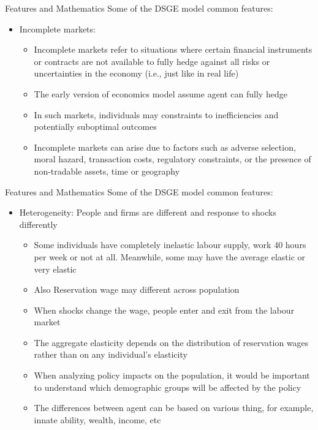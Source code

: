 \documentclass[aspectratio=1610]{beamer}
\begin{document}
\begin{frame}[wide]{Features and Mathematics}
	Some of the DSGE model common features:
	\begin{itemize}
		\item Incomplete markets:
		\begin{itemize}
			\item Incomplete markets refer to situations where certain financial instruments or contracts are not available to fully hedge against all risks or uncertainties in the economy (i.e., just like in real life)
			\item The early version of economics model assume agent can fully hedge 
			\item In such markets, individuals may constraints to inefficiencies and potentially suboptimal outcomes
			\item Incomplete markets can arise due to factors such as adverse selection, moral hazard, transaction costs, regulatory constraints, or the presence of non-tradable assets, time or geography
		\end{itemize}
	\end{itemize}
\end{frame}

\begin{frame}[wide]{Features and Mathematics}
	Some of the DSGE model common features:
	\begin{itemize}
		\item Heterogeneity: People and firms are different and response to shocks differently
		\begin{itemize}
			\item Some individuals have completely inelastic labour supply, work 40 hours per week or not at all. Meanwhile, some may have the average elastic or very elastic
			\item Also Reservation wage may different across population
			\item When shocks change the wage, people enter and exit from the labour market
			\item The aggregate elasticity depends on the distribution of reservation wages rather than on any individual’s elasticity
			\item When analyzing policy impacts on the population, it would be important to understand which demographic groups will be affected by the policy
			\item The differences between agent can be based on various thing, for example, innate ability, wealth, income, etc
		\end{itemize}
	\end{itemize}
\end{frame}
\end{document}
